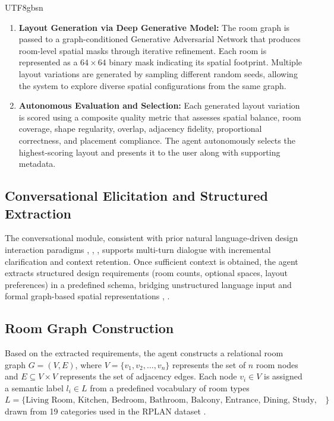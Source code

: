 \documentclass[11pt]{article}
\let\cite\citep
\providecommand\citep{\cite}
\begin{document}
\begin{CJK}{UTF8}{gbsn}
\begin{enumerate}
    \item \textbf{Layout Generation via Deep Generative Model:} The room graph is passed to a graph-conditioned Generative Adversarial Network that produces room-level spatial masks through iterative refinement. Each room is represented as a $64 \times 64$ binary mask indicating its spatial footprint. Multiple layout variations are generated by sampling different random seeds, allowing the system to explore diverse spatial configurations from the same graph.

    \item \textbf{Autonomous Evaluation and Selection:} Each generated layout variation is scored using a composite quality metric that assesses spatial balance, room coverage, shape regularity, overlap, adjacency fidelity, proportional correctness, and placement compliance. The agent autonomously selects the highest-scoring layout and presents it to the user along with supporting metadata.
\end{enumerate}

\subsection*{Conversational Elicitation and Structured Extraction}

The conversational module, consistent with prior natural language-driven design interaction paradigms \cite{b1}, \cite{b15}, \cite{b20}, supports multi-turn dialogue with incremental clarification and context retention. Once sufficient context is obtained, the agent extracts structured design requirements (room counts, optional spaces, layout preferences) in a predefined schema, bridging unstructured language input and formal graph-based spatial representations \cite{b18}, \cite{b19}.

\subsection*{Room Graph Construction}
Based on the extracted requirements, the agent constructs a relational room graph $G = (V, E)$, where $V = \{v_1, v_2, \ldots, v_n\}$ represents the set of $n$ room nodes and $E \subseteq V \times V$ represents the set of adjacency edges. Each node $v_i \in V$ is assigned a semantic label $l_i \in L$ from a predefined vocabulary of room types $L = \{\text{Living Room, Kitchen, Bedroom, Bathroom, Balcony, Entrance, Dining, Study, Storage, \ldots}\}$ drawn from 19 categories used in the RPLAN dataset \cite{b18}.


\end{CJK}
\end{document}
